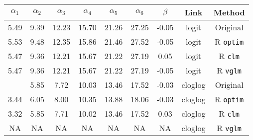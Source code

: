 
\begin{tabular}{ccccccccc}
\toprule
$\alpha_1$ & $\alpha_2$ & $\alpha_3$ & $\alpha_4$ & $\alpha_5$ & $\alpha_6$ & $\beta$ & Link & Method\\
\midrule
5.49 & 9.39 & 12.23 & 15.70 & 21.26 & 27.25 & -0.05 & logit & Original \citep{candy1991modeling}\\
5.53 & 9.48 & 12.35 & 15.86 & 21.46 & 27.52 & -0.05 & logit & R \verb+optim+\\
5.47 & 9.36 & 12.21 & 15.67 & 21.22 & 27.19 & 0.05 & logit & R \verb+clm+\\
5.47 & 9.36 & 12.21 & 15.67 & 21.22 & 27.19 & -0.05 & logit & R \verb+vglm+\\
\addlinespace
3.32 & 5.85 & 7.72 & 10.03 & 13.46 & 17.52 & -0.03 & cloglog & Original \citep{candy1991modeling}\\
3.44 & 6.05 & 8.00 & 10.35 & 13.88 & 18.06 & -0.03 & cloglog & R \verb+optim+\\
3.32 & 5.85 & 7.71 & 10.02 & 13.46 & 17.52 & 0.03 & cloglog & R \verb+clm+\\
NA & NA & NA & NA & NA & NA & NA & cloglog & R \verb+vglm+\\
\bottomrule
\end{tabular}